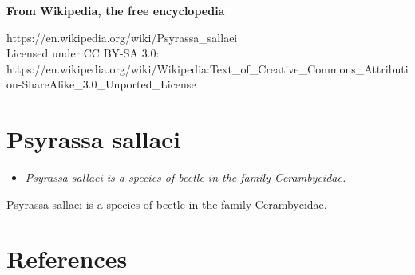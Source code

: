 \textbf{From Wikipedia, the free encyclopedia}

https://en.wikipedia.org/wiki/Psyrassa\_sallaei\\
Licensed under CC BY-SA 3.0:\\
https://en.wikipedia.org/wiki/Wikipedia:Text\_of\_Creative\_Commons\_Attribution-ShareAlike\_3.0\_Unported\_License

\section{Psyrassa sallaei}\label{psyrassa-sallaei}

\begin{itemize}
\item
  \emph{Psyrassa sallaei is a species of beetle in the family
  Cerambycidae.}
\end{itemize}

Psyrassa sallaei is a species of beetle in the family Cerambycidae.

\section{References}\label{references}
